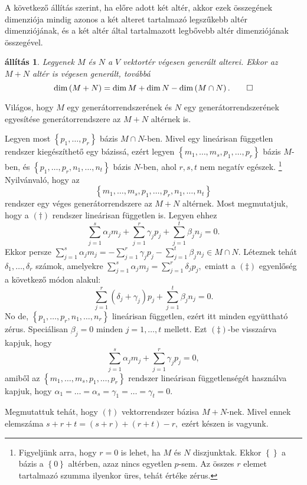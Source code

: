\documentclass[9pt, a4paper, showtrims]{memoir}
\makeatletter
\renewenvironment{proof}[1][\proofname]
    {\par\pushQED{\qed}%
    \normalfont \topsep6\p@\@plus6\p@\relax
    \trivlist
    \item[\hskip\labelsep
        \itshape
    #1\@addpunct{:}]\ignorespaces}
    {\popQED\endtrivlist\@endpefalse}
\theoremstyle{plain}
\newtheorem{proposition}{állítás}[chapter]
\theoremstyle{remark}
\theoremstyle{definition}
\makeatother
\begin{document}
A következő állítás szerint,
ha előre adott két altér, akkor ezek összegének dimenziója mindig azonos
a két alteret tartalmazó legszűkebb altér dimenziójának,
és a két altér által tartalmazott legbővebb altér  dimenziójának összegével.
\begin{proposition}\label{pr:drosszeg2}
    Legyenek $M$ és $N$ a $V$ vektortér végesen generált alterei.
    Ekkor az $M+N$ altér is végesen generált, 
    továbbá
    \[
        \dim\left( M+N \right)=\dim M+\dim N-\dim \left( M\cap N \right).\qedhere
    \]
\end{proposition}
\begin{proof}
    Világos, hogy $M$ egy generátorrendszerének és $N$ egy generátorrendszerének egyesítése
    generátorrendszere az $M+N$ altérnek is.

    Legyen most $\left\{ p_1,\dots,p_r \right\}$ bázis $M\cap N$-ben.
    Mivel egy lineárisan független rendszer kiegészíthető egy bázissá,
    ezért legyen
    $\left\{ m_1,\dots,m_s,p_1,\dots,p_r \right\}$ bázis $M$-ben, 
    és
    $\left\{ p_1,\dots,p_r,n_1,\dots,n_t \right\}$ bázis $N$-ben,
    ahol $r,s,t$ nem negatív egészek.%
    \footnote{
        Figyeljünk arra, hogy $r=0$ is lehet, ha $M$ és $N$ diszjunktak.
        Ekkor $\left\{  \right\}$ a bázis a $\left\{ 0 \right\}$ altérben,
        azaz nincs egyetlen $p$-sem. 
    Az összes $r$ elemet tartalmazó szumma ilyenkor üres, tehát értéke zérus.
    }
    Nyilvánvaló, hogy az
    \[
        \left\{ m_1,\dots,m_s,p_1,\dots,p_r,n_1,\dots,n_t \right\}\tag{\dag}
    \]
    rendszer egy véges generátorrendszere az $M+N$ altérnek.
    Most megmutatjuk,
    hogy a $(\dag)$ rendszer lineárisan független is.
    Legyen ehhez
    \[
        \sum_{j=1}^s\alpha_j m_j+\sum_{j=1}^r\gamma_j p_j+\sum_{j=1}^t\beta_jn_j=0.\tag{\ddag}
    \]
    Ekkor persze 
    \(
        \sum_{j=1}^s\alpha_j m_j =
        -\sum_{j=1}^r\gamma_j p_j
        -\sum_{j=1}^t\beta_jn_j
        \in
        M\cap N.
    \)
    Léteznek tehát $\delta_1,\dots,\delta_r$ számok, 
    amelyekre
    \(
        \sum_{j=1}^s\alpha_j m_j=
        \sum_{j=1}^r\delta_j p_j,
    \)
    emiatt a $(\ddag)$ egyenlőség a következő módon alakul:
    \[
        \sum_{j=1}^r\left( \delta_j+\gamma_j \right)p_j+\sum_{j=1}^t\beta_jn_j=0.
    \]
    No de, $\left\{ p_1,\dots,p_r,n_1,\dots,n_r \right\}$ lineárisan független,
    ezért itt minden együttható zérus.
    Speciálisan $\beta_j=0$ minden $j=1,\dots,t$ mellett.
    Ezt $(\ddag)$-be visszaírva kapjuk, hogy
    \[
        \sum_{j=1}^s\alpha_j m_j+\sum_{j=1}^r\gamma_j p_j=0,
    \]
    amiből az $\left\{ m_1,\dots,m_s,p_1,\dots,p_r \right\}$ rendszer lineárisan függetlenségét használva kapjuk,
    hogy $\alpha_1=\dots=\alpha_s=\gamma_1=\dots=\gamma_t=0$.


    Megmutattuk tehát, hogy $(\dag)$ vektorrendszer bázisa $M+N$-nek.
    Mivel ennek elemszáma
    \begin{math}
        s+r+t=\left( s+r \right)+\left( r+t \right)-r,
    \end{math}
    ezért készen is vagyunk.
\end{proof}
\end{document}
